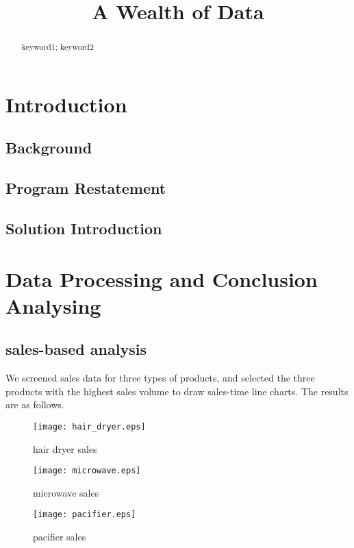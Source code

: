 \documentclass{mcmthesis}
\title{A Wealth of Data}
\begin{document}
\begin{abstract}

	\begin{keywords}
		keyword1; keyword2
	\end{keywords}
\end{abstract}
\maketitle
\section{Introduction}

\subsection{Background}


\subsection{Program Restatement}

\subsection{Solution Introduction}

\section{Data Processing and Conclusion Analysing}

\subsection{sales-based analysis}
We screened sales data for three types of products, and selected the three products with the highest sales volume to draw sales-time line charts. The results are as follows.

\begin{figure}[H]
\small
\centering
\texttt{[image: hair\_dryer.eps]}
\caption{hair dryer sales} \label{hair dryer sales}
\end{figure}

\begin{figure}[H]
	\small
	\centering
	\texttt{[image: microwave.eps]}
	\caption{microwave sales} \label{microwave sales}
\end{figure}

\begin{figure}[H]
	\small
	\centering
	\texttt{[image: pacifier.eps]}
	\caption{pacifier sales} \label{pacifier sales}
\end{figure}
\end{document}
